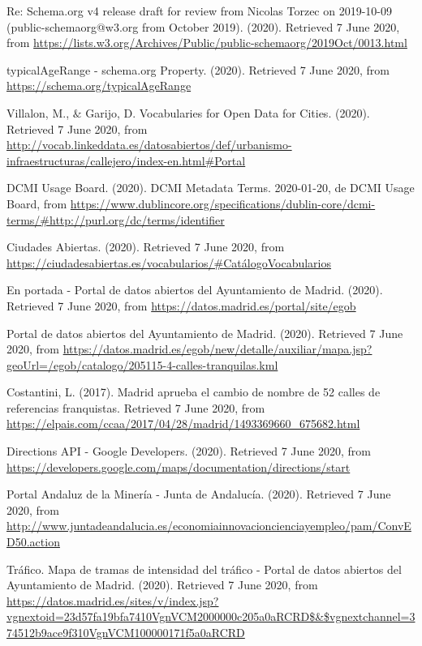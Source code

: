 \begin{thebibliography}{99}
 Re: Schema.org v4 release draft for review from Nicolas Torzec on 2019-10-09 (public-schemaorg@w3.org from October 2019). (2020). Retrieved 7 June 2020, from \url{https://lists.w3.org/Archives/Public/public-schemaorg/2019Oct/0013.html}

 typicalAgeRange - schema.org Property. (2020). Retrieved 7 June 2020, from \url{https://schema.org/typicalAgeRange}


 Villalon, M., $\&$ Garijo, D. Vocabularies for Open Data for Cities. (2020). Retrieved 7 June 2020, from \url{http://vocab.linkeddata.es/datosabiertos/def/urbanismo-infraestructuras/callejero/index-en.html#Portal}


 DCMI Usage Board. (2020). DCMI Metadata Terms. 2020-01-20, de DCMI Usage Board, from \url{https://www.dublincore.org/specifications/dublin-core/dcmi-terms/#http://purl.org/dc/terms/identifier}


 Ciudades Abiertas. (2020). Retrieved 7 June 2020, from \url{https://ciudadesabiertas.es/vocabularios/#CatálogoVocabularios}


 En portada - Portal de datos abiertos del Ayuntamiento de Madrid. (2020). Retrieved 7 June 2020, from \url{https://datos.madrid.es/portal/site/egob}

 Portal de datos abiertos del Ayuntamiento de Madrid. (2020). Retrieved 7 June 2020, from \url{https://datos.madrid.es/egob/new/detalle/auxiliar/mapa.jsp?geoUrl=/egob/catalogo/205115-4-calles-tranquilas.kml}

 Costantini, L. (2017). Madrid aprueba el cambio de nombre de 52 calles de referencias franquistas. Retrieved 7 June 2020, from \url{https://elpais.com/ccaa/2017/04/28/madrid/1493369660_675682.html}

 Directions API - Google Developers. (2020). Retrieved 7 June 2020, from \url{https://developers.google.com/maps/documentation/directions/start}

 Portal Andaluz de la Minería - Junta de Andalucía. (2020). Retrieved 7 June 2020, from \url{http://www.juntadeandalucia.es/economiainnovacioncienciayempleo/pam/ConvED50.action}

 Tráfico. Mapa de tramas de intensidad del tráfico - Portal de datos abiertos del Ayuntamiento de Madrid. (2020). Retrieved 7 June 2020, from \url{https://datos.madrid.es/sites/v/index.jsp?vgnextoid=23d57fa19bfa7410VgnVCM2000000c205a0aRCRD$\&$vgnextchannel=374512b9ace9f310VgnVCM100000171f5a0aRCRD}


\end{thebibliography}
